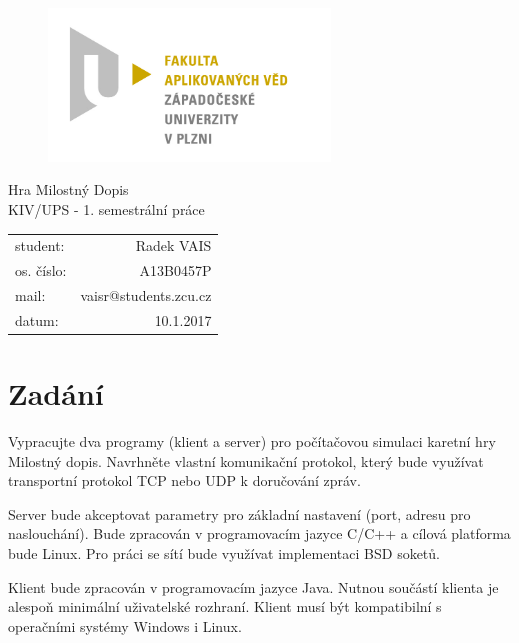 \documentclass[12pt, a4paper]{article}
\begin{document}
\begin{figure}[h!]
\centering
\includegraphics[bb= 0 0 820 445 , width=75mm]{favlogo.jpg}
\end{figure}

\vspace{5cm}

{\centering
{\huge Hra Milostný Dopis}\\[1em]
{\large KIV/UPS - 1. semestrální práce}\\[7,5cm]
}

\begin{tabular}{l r}
student: & Radek VAIS\\
os. číslo: & A13B0457P\\
mail: & vaisr@students.zcu.cz\\
datum: & 10.1.2017\\
\end{tabular}

\thispagestyle{empty}
\newpage

\section{Zadání} %

Vypracujte dva programy (klient a server) pro počítačovou simulaci karetní hry Milostný dopis. Navrhněte vlastní komunikační protokol, který bude využívat transportní protokol TCP nebo UDP k doručování zpráv.

Server bude akceptovat parametry pro základní nastavení (port, adresu pro naslouchání). Bude zpracován v programovacím jazyce C/C++ a cílová platforma bude Linux. Pro práci se sítí bude využívat implementaci BSD soketů.

Klient bude zpracován v programovacím jazyce Java. Nutnou součástí klienta je alespoň minimální uživatelské rozhraní. Klient musí být kompatibilní s operačními systémy Windows i Linux.  
\end{document}
